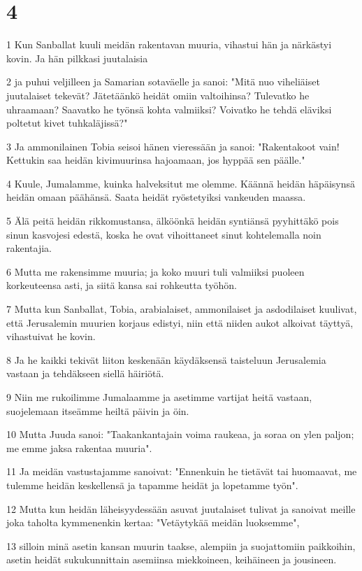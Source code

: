 \chapter{4}

\par 1 Kun Sanballat kuuli meidän rakentavan muuria, vihastui hän ja närkästyi kovin. Ja hän pilkkasi juutalaisia
\par 2 ja puhui veljilleen ja Samarian sotaväelle ja sanoi: "Mitä nuo viheliäiset juutalaiset tekevät? Jätetäänkö heidät omiin valtoihinsa? Tulevatko he uhraamaan? Saavatko he työnsä kohta valmiiksi? Voivatko he tehdä eläviksi poltetut kivet tuhkaläjissä?"
\par 3 Ja ammonilainen Tobia seisoi hänen vieressään ja sanoi: "Rakentakoot vain! Kettukin saa heidän kivimuurinsa hajoamaan, jos hyppää sen päälle."
\par 4 Kuule, Jumalamme, kuinka halveksitut me olemme. Käännä heidän häpäisynsä heidän omaan päähänsä. Saata heidät ryöstetyiksi vankeuden maassa.
\par 5 Älä peitä heidän rikkomustansa, älköönkä heidän syntiänsä pyyhittäkö pois sinun kasvojesi edestä, koska he ovat vihoittaneet sinut kohtelemalla noin rakentajia.
\par 6 Mutta me rakensimme muuria; ja koko muuri tuli valmiiksi puoleen korkeuteensa asti, ja siitä kansa sai rohkeutta työhön.
\par 7 Mutta kun Sanballat, Tobia, arabialaiset, ammonilaiset ja asdodilaiset kuulivat, että Jerusalemin muurien korjaus edistyi, niin että niiden aukot alkoivat täyttyä, vihastuivat he kovin.
\par 8 Ja he kaikki tekivät liiton keskenään käydäksensä taisteluun Jerusalemia vastaan ja tehdäkseen siellä häiriötä.
\par 9 Niin me rukoilimme Jumalaamme ja asetimme vartijat heitä vastaan, suojelemaan itseämme heiltä päivin ja öin.
\par 10 Mutta Juuda sanoi: "Taakankantajain voima raukeaa, ja soraa on ylen paljon; me emme jaksa rakentaa muuria".
\par 11 Ja meidän vastustajamme sanoivat: "Ennenkuin he tietävät tai huomaavat, me tulemme heidän keskellensä ja tapamme heidät ja lopetamme työn".
\par 12 Mutta kun heidän läheisyydessään asuvat juutalaiset tulivat ja sanoivat meille joka taholta kymmenenkin kertaa: "Vetäytykää meidän luoksemme",
\par 13 silloin minä asetin kansan muurin taakse, alempiin ja suojattomiin paikkoihin, asetin heidät sukukunnittain asemiinsa miekkoineen, keihäineen ja jousineen.
